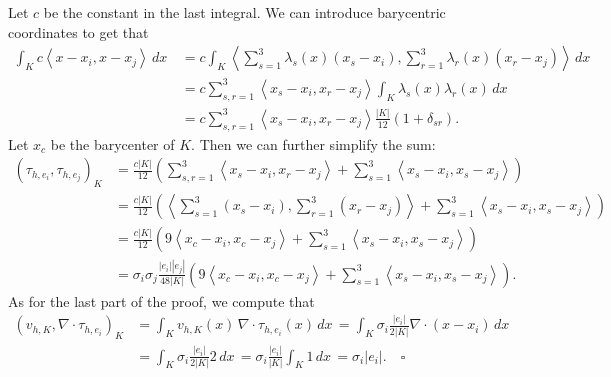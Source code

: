 \documentclass[a4paper]{article}
\newcommand{\dx}{\, dx \,}
\newcommand{\area}[1]{\left\lvert #1 \right\rvert}
\newcommand{\abs}[1]{\left\lvert #1 \right\rvert}
\newcommand{\dpair}[1]{\left\langle #1 \right\rangle}
\begin{document}
Let $c$ be the constant in the last integral.
We can introduce barycentric coordinates to get that
\begin{align*}
	\int_K c \dpair{x-x_i,x-x_j} \dx
&	= c \int_K \dpair{\sum_{s=1}^3 \lambda_s(x) (x_s-x_i),
	                  \sum_{r=1}^3 \lambda_r(x) (x_r-x_j)} \dx \\
&	= c \sum_{s,r = 1}^3 \dpair{x_s-x_i,x_r-x_j} \int_K \lambda_s(x) \lambda_r(x) \dx \\
&	= c \sum_{s,r = 1}^3 \dpair{x_s-x_i,x_r-x_j} \frac{\abs{K}}{12}(1+\delta_{sr}).
\end{align*}
Let $x_c$ be the barycenter of $K$.
Then we can further simplify the sum:
\begin{align*}
	(\tau_{h,e_i},\tau_{h,e_j})_K
&	= \frac{c\abs{K}}{12} \left( \sum_{s,r = 1}^3 \dpair{x_s-x_i,x_r-x_j} 
	                           + \sum_{s = 1}^3 \dpair{x_s-x_i,x_s-x_j} \right) \\
&	= \frac{c\abs{K}}{12} \left( \dpair{\sum_{s=1}^3 (x_s-x_i), \sum_{r=1}^3 (x_r-x_j)}
	                           + \sum_{s = 1}^3 \dpair{x_s-x_i,x_s-x_j} \right) \\
&	= \frac{c\abs{K}}{12} \left( 9 \dpair{x_c-x_i, x_c-x_j}
	                           + \sum_{s = 1}^3 \dpair{x_s-x_i,x_s-x_j} \right) \\
&	= \sigma_i \sigma_j \frac{\abs{e_i}\abs{e_j}}{48\area{K}}
      \left( 9 \dpair{x_c-x_i, x_c-x_j} + \sum_{s = 1}^3 \dpair{x_s-x_i,x_s-x_j} \right).
\end{align*}
As for the last part of the proof, we compute that
\begin{align*}
	(v_{h,K},\nabla\!\cdot\tau_{h,e_i})_K
&	= \int_K v_{h,K}(x) \, \nabla\!\cdot\tau_{h,e_i}(x) \dx
	= \int_K \sigma_i \frac{\abs{e_i}}{2\area{K}}
	         \nabla\!\cdot (x-x_i) \dx \\
&	= \int_K \sigma_i \frac{\abs{e_i}}{2\area{K}} 2 \dx
	= \sigma_i \frac{\abs{e_i}}{\area{K}} \int_K 1 \dx
	= \sigma_i \abs{e_i}. \quad \square
\end{align*}
\end{document}
